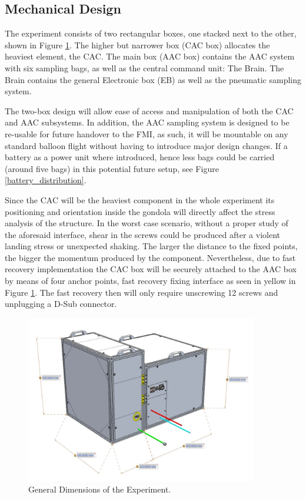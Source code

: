 \pagebreak
\subsection{Mechanical Design} \label{Mechanical_Design}

The experiment consists of two rectangular boxes, one stacked next to the other, shown in Figure \ref{dimensions}. The higher but narrower box (CAC box) allocates the heaviest element, the CAC. The main box (AAC box) contains the AAC system with six sampling bags, as well as the central command unit: The Brain. The Brain contains the general Electronic box (EB) as well as the pneumatic sampling system.

The two-box design will allow ease of access and manipulation of both the CAC and AAC subsystems. In addition, the AAC sampling system is designed to be re-usable for future handover to the FMI, as such, it will be mountable on any standard balloon flight without having to introduce major design changes. If a battery as a power unit where introduced, hence less bags could be carried (around five bags) in this potential future setup, see Figure \ref{battery_distribution}.

\smallskip
Since the CAC will be the heaviest component in the whole experiment its positioning and orientation inside the gondola will directly affect the stress analysis of the structure. In the worst case scenario, without a proper study of the aforesaid interface, shear in the screws could be produced after a violent landing stress or unexpected shaking. The larger the distance to the fixed points, the bigger the momentum produced by the component. Nevertheless, due to fast recovery implementation the CAC box will be securely attached to the AAC box by means of four anchor points, fast recovery fixing interface as seen in yellow in Figure \ref{dimensions}. The fast recovery then will only require unscrewing 12 screws and unplugging a D-Sub connector.

 \begin{figure}[H]
     \centering
     \includegraphics[width=0.9\textwidth]{4-experiment-design/img/Mechanical/tubular_dimensions.jpg}
     \caption{General Dimensions of the Experiment.}
     \label{dimensions}
\end{figure}

